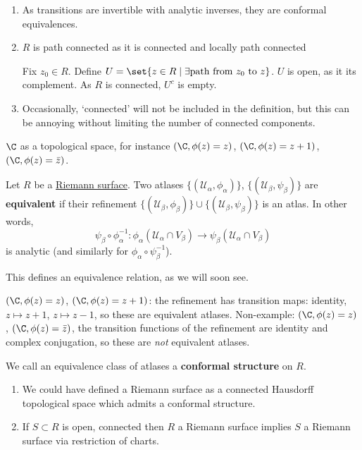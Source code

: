 \documentclass{article}
\begin{document}
\begin{remark}
    \leavevmode
    \begin{enumerate}
        \item As transitions are invertible with analytic inverses, they are conformal equivalences.
        \item $R$ is path connected as it is connected and locally path connected

            Fix $z_0 \in R$. Define $U = \set{z \in R \mid \exists\text{path from } z_0 \text{ to } z}$. $U$ is open, as it its complement. As $R$ is connected, $U^c$ is empty.
        \item Occasionally, `connected' will not be included in the definition, but this can be annoying without limiting the number of connected components.
    \end{enumerate}
\end{remark}

\begin{eg}
    $\C$ as a topological space, for instance $(\C, \phi(z) = z)$, $(\C, \phi(z) = z+1)$, $(\C, \phi(z) = \bar{z})$.
\end{eg}

\begin{defi}
    Let $R$ be a \hyperlink{def:rs}{Riemann surface}.
    Two atlases $\{(\mathcal{U}_\alpha, \phi_\alpha)\}$, $\{(\mathcal{U}_\beta, \psi_\beta)\}$ are \textbf{equivalent} if their refinement $\{(\mathcal{U}_\beta, \phi_\beta)\} \cup \{(\mathcal{U}_\beta, \psi_\beta)\}$ is an atlas. In other words,
    \begin{equation}
        \psi_\beta \circ \phi_\alpha^{-1}: \phi_\alpha(\mathcal{U}_\alpha \cap V_\beta) \to \psi_\beta(\mathcal{U}_\alpha \cap V_\beta)
    \end{equation}
    is analytic (and similarly for $\phi_\alpha \circ \psi_\beta^{-1}$).
\end{defi}
This defines an equivalence relation, as we will soon see.

\begin{eg}
    $(\C, \phi(z) = z)$, $(\C, \phi(z) = z+1)$: the refinement has transition maps: identity, $z \mapsto z+1$, $z \mapsto z-1$, so these are equivalent atlases.
    Non-example:
    $(\C, \phi(z) = z)$, $(\C, \phi(z) = \bar{z})$, the transition functions of the refinement are identity and complex conjugation, so these are \emph{not} equivalent atlases.
\end{eg}

\begin{defi}
    We call an equivalence class of atlases a \textbf{conformal structure} on $R$.
\end{defi}
\begin{remark}
    \begin{enumerate}
        \item We could have defined a Riemann surface as a connected Hausdorff topological space which admits a conformal structure.
        \item If $S \subset R$ is open, connected then $R$ a Riemann surface implies $S$ a Riemann surface via restriction of charts.
    \end{enumerate}
\end{remark}
\end{document}
